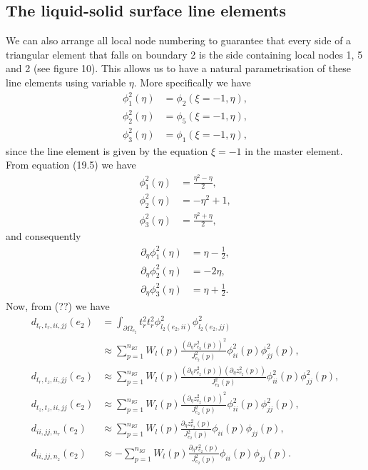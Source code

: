 \documentclass{article}
\begin{document}
\subsection{The liquid-solid surface line elements}
We can also arrange all local node numbering to guarantee that every side of a triangular element that falls on boundary 2 is the side containing local nodes 1, 5 and 2 (see figure 10). This allows us to have a natural parametrisation of these line elements using variable \(\eta\). More specifically we have
\begin{align}
\phi_1^2(\eta) &= \phi_2(\xi=-1,\eta), \tag{21.33}\\
\phi_2^2(\eta) &= \phi_5(\xi=-1,\eta), \tag{21.34}\\
\phi_3^2(\eta) &= \phi_1(\xi=-1,\eta), \tag{21.35}
\end{align}
since the line element is given by the equation \(\xi=-1\) in the master element.
From equation (19.5) we have
\begin{align}
\phi_1^2(\eta) &= \frac{\eta^2 - \eta}{2}, \tag{21.37}\\
\phi_2^2(\eta) &= -\eta^2 + 1, \tag{21.39}\\
\phi_3^2(\eta) &= \frac{\eta^2 + \eta}{2}, \tag{21.40}
\end{align}
and consequently
\begin{align}
\partial_\eta \phi_1^2(\eta) &= \eta - \frac12, \tag{21.41}\\
\partial_\eta \phi_2^2(\eta) &= -2\eta, \tag{21.42}\\
\partial_\eta \phi_3^2(\eta) &= \eta + \frac12. \tag{21.43}
\end{align}
Now, from (??) we have
\begin{align}
d_{t_r,t_r,ii,jj}(e_2) &= \int_{\partial\Omega_{e_2}} t_r^2 t_r^2 \phi_{l_2(e_2,ii)}^2 \phi_{l_2(e_2,jj)}^2 \nonumber\\
&\approx \sum_{p=1}^{n_{IG}} W_l(p) \frac{ (\partial_\eta r_{e_2}^2(p))^2 }{ J_{e_2}^2(p) } \phi_{ii}^2(p) \phi_{jj}^2(p), \tag{21.50}\\
d_{t_r,t_z,ii,jj}(e_2) &\approx \sum_{p=1}^{n_{IG}} W_l(p) \frac{ (\partial_\eta r_{e_2}^2(p)) (\partial_\eta z_{e_2}^2(p)) }{ J_{e_2}^2(p) } \phi_{ii}^2(p) \phi_{jj}^2(p), \tag{21.53}\\
d_{t_z,t_z,ii,jj}(e_2) &\approx \sum_{p=1}^{n_{IG}} W_l(p) \frac{ (\partial_\eta z_{e_2}^2(p))^2 }{ J_{e_2}^2(p) } \phi_{ii}^2(p) \phi_{jj}^2(p), \tag{21.56}\\
d_{ii,jj,n_r}(e_2) &\approx \sum_{p=1}^{n_{IG}} W_l(p) \frac{ \partial_\eta z_{e_2}^2(p) }{ J_{e_2}^2(p) } \phi_{ii}(p) \phi_{jj}(p), \tag{21.60}\\
d_{ii,jj,n_z}(e_2) &\approx -\sum_{p=1}^{n_{IG}} W_l(p) \frac{ \partial_\eta r_{e_2}^2(p) }{ J_{e_2}^2(p) } \phi_{ii}(p) \phi_{jj}(p). \tag{21.63}
\end{align}
\end{document}
